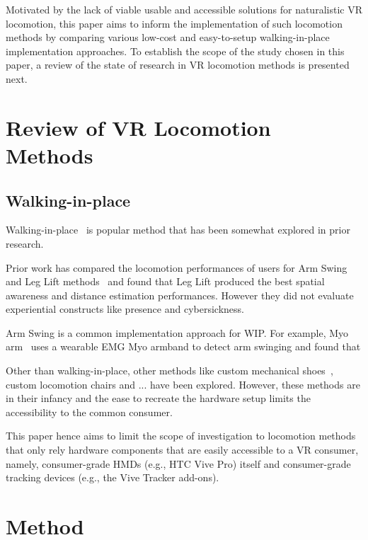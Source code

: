 \documentclass[manuscript,review,anonymous]{acmart}
\begin{document}
Motivated by the lack of viable usable and accessible solutions for naturalistic VR locomotion, this paper aims to inform the implementation of such locomotion methods by comparing various low-cost and easy-to-setup walking-in-place implementation approaches. To establish the scope of the study chosen in this paper, a review of the state of research in VR locomotion methods is presented next.


\section{Review of VR Locomotion Methods}

\subsection{Walking-in-place}

Walking-in-place~\cite{virtualLoco1999} is popular method that has been somewhat explored in prior research.

Prior work has compared the locomotion performances of users for Arm Swing and Leg Lift methods~\cite{vrLocoWalkingHeadBob2016} and found that Leg Lift produced the best spatial awareness and distance estimation performances. However they did not evaluate experiential constructs like presence and cybersickness.

Arm Swing is a common implementation approach for WIP. For example, Myo arm~\cite{mccullough2015myo} uses a wearable EMG Myo armband to detect arm swinging and found that

Other than walking-in-place, other methods like custom mechanical shoes~\cite{podoportation2020}, custom locomotion chairs and ... have been explored. However, these methods are in their infancy and the ease to recreate the hardware setup limits the accessibility to the common consumer.

This paper hence aims to limit the scope of investigation to locomotion methods that only rely hardware components that are easily accessible to a VR consumer, namely, consumer-grade HMDs (e.g., HTC Vive Pro) itself and consumer-grade tracking devices (e.g., the Vive Tracker add-ons).


\section{Method}
\end{document}
